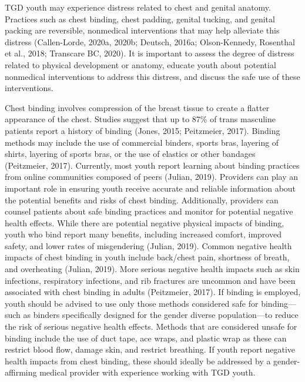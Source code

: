 \documentclass[
]{book}
\begin{document}
TGD youth may experience distress related to
chest and genital anatomy. Practices such as chest
binding, chest padding, genital tucking, and genital packing are reversible, nonmedical interventions that may help alleviate this distress
(Callen-Lorde, 2020a, 2020b; Deutsch, 2016a;
Olson-Kennedy, Rosenthal et al., 2018; Transcare
BC, 2020). It is important to assess the degree
of distress related to physical development or
anatomy, educate youth about potential nonmedical interventions to address this distress, and
discuss the safe use of these interventions.

Chest binding involves compression of the
breast tissue to create a flatter appearance of the
chest. Studies suggest that up to 87\% of trans
masculine patients report a history of binding
(Jones, 2015; Peitzmeier, 2017). Binding methods
may include the use of commercial binders,
sports bras, layering of shirts, layering of sports
bras, or the use of elastics or other bandages
(Peitzmeier, 2017). Currently, most youth report
learning about binding practices from online
communities composed of peers (Julian,
2019). Providers can play an important role in
ensuring youth receive accurate and reliable
information about the potential benefits and risks
of chest binding. Additionally, providers can
counsel patients about safe binding practices and
monitor for potential negative health effects.
While there are potential negative physical
impacts of binding, youth who bind report many
benefits, including increased comfort, improved
safety, and lower rates of misgendering (Julian,
2019). Common negative health impacts of chest
binding in youth include back/chest pain, shortness of breath, and overheating (Julian, 2019).
More serious negative health impacts such as skin
infections, respiratory infections, and rib fractures
are uncommon and have been associated with
chest binding in adults (Peitzmeier, 2017). If
binding is employed, youth should be advised to
use only those methods considered safe for binding---such as binders specifically designed for the
gender diverse population---to reduce the risk of
serious negative health effects. Methods that are
considered unsafe for binding include the use of
duct tape, ace wraps, and plastic wrap as these
can restrict blood flow, damage skin, and restrict
breathing. If youth report negative health
impacts from chest binding, these should ideally
be addressed by a gender-affirming medical provider with experience working with TGD youth.
\end{document}
